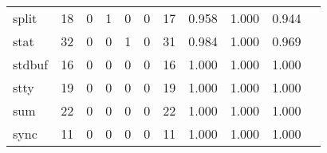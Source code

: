 \begin{longtable}{lp{1.2cm}p{1.2cm}p{1.2cm}p{1.2cm}p{1.2cm}p{1.2cm}p{1.2cm}p{1.2cm}p{1.2cm}p{1.2cm}}
split     &                                    18 &                                                  0 &                                                  1 &                                                  0 &                                                  0 &                                                 17 &                                              0.958 &                                              1.000 &                                              0.944 \\
stat      &                                    32 &                                                  0 &                                                  0 &                                                  1 &                                                  0 &                                                 31 &                                              0.984 &                                              1.000 &                                              0.969 \\
stdbuf    &                                    16 &                                                  0 &                                                  0 &                                                  0 &                                                  0 &                                                 16 &                                              1.000 &                                              1.000 &                                              1.000 \\
stty      &                                    19 &                                                  0 &                                                  0 &                                                  0 &                                                  0 &                                                 19 &                                              1.000 &                                              1.000 &                                              1.000 \\
sum       &                                    22 &                                                  0 &                                                  0 &                                                  0 &                                                  0 &                                                 22 &                                              1.000 &                                              1.000 &                                              1.000 \\
sync      &                                    11 &                                                  0 &                                                  0 &                                                  0 &                                                  0 &                                                 11 &                                              1.000 &                                              1.000 &                                              1.000 \\

\end{longtable}
